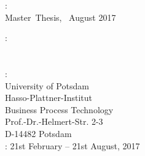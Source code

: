\thispagestyle{empty}

\hfill

\vfill

\noindent\myName: \textit{\myTitle}\\
Master~Thesis, %
\textcopyright\ August 2017

\bigskip
%
\noindent{}: \\
\myProf \\
\mySupervisor \\
%
\medskip
%
\noindent {}: \\
University of Potsdam\\
Hasso-Plattner-Institut\\
Business Process Technology\\
Prof.-Dr.-Helmert-Str. 2-3\\
D-14482 Potsdam\\
%
\medskip
%
\noindent{}: 21st February -- 21st August, 2017 \\
